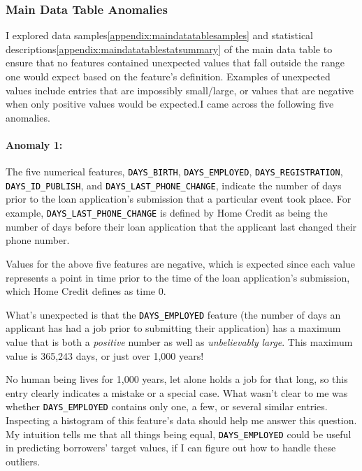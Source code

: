 \documentclass[12pt, letterpaper]{article}
\begin{document}
\subsubsection{Main Data Table Anomalies}
I explored data samples\ref{appendix:maindatatablesamples} and statistical descriptions\ref{appendix:maindatatablestatsummary} of the main data table to ensure that no features contained unexpected values that fall outside the range one would expect based on the feature's definition. Examples of unexpected values include entries that are impossibly small/large, or values that are negative when only positive values would be expected.I came across the following five anomalies.

\paragraph{Anomaly 1:}
The five numerical features, \colorbox{backcolor}{\textcolor{black}{\texttt{DAYS_BIRTH}}}, \colorbox{backcolor}{\textcolor{black}{\texttt{DAYS_EMPLOYED}}}, \colorbox{backcolor}{\textcolor{black}{\texttt{DAYS_REGISTRATION}}}, \colorbox{backcolor}{\textcolor{black}{\texttt{DAYS_ID_PUBLISH}}}, and \colorbox{backcolor}{\textcolor{black}{\texttt{DAYS_LAST_PHONE_CHANGE}}}, indicate the number of days prior to the loan application's submission that a particular event took place. For example, \colorbox{backcolor}{\textcolor{black}{\texttt{DAYS_LAST_PHONE_CHANGE}}} is defined by Home Credit as being the number of days before their loan application that the applicant last changed their phone number.

Values for the above five features are negative, which is expected since each value represents a point in time prior to the time of the loan application's submission, which Home Credit defines as time 0.

What's unexpected is that the \colorbox{backcolor}{\textcolor{black}{\texttt{DAYS_EMPLOYED}}} feature (the number of days an applicant has had a job prior to submitting their application) has a maximum value that is both a \textit{positive} number as well as \textit{unbelievably large}. This maximum value is 365,243 days, or just over 1,000 years!

No human being lives for 1,000 years, let alone holds a job for that long, so this entry clearly indicates a mistake or a special case. What wasn't clear to me was whether \colorbox{backcolor}{\textcolor{black}{\texttt{DAYS_EMPLOYED}}} contains only one, a few, or several similar entries. Inspecting a histogram of this feature's data should help me answer this question. My intuition tells me that all things being equal, \colorbox{backcolor}{\textcolor{black}{\texttt{DAYS_EMPLOYED}}} could be useful in predicting borrowers' target values, if I can figure out how to handle these outliers.
\end{document}
